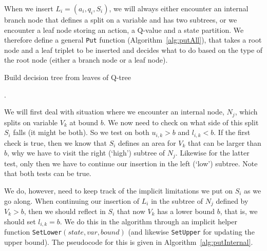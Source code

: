 \documentclass{article}
\begin{document}
When we insert $L_i = (a_i, q_i, S_i)$, we will always either encounter an
internal branch node that defines a split on a variable and has two subtrees, or
we encounter a leaf node storing an action, a Q-value and a state partition. We
therefore define a general \texttt{Put} function (Algorithm~\ref{alg:putAll}),
that takes a root node and a leaf triplet to be inserted and decides what to do based
on the type of the root node (either a branch node or a leaf node).

\begin{algorithm}[ht]
    \caption{Build decision tree from leaves of Q-tree}\label{alg:putAll}.

    \begin{algorithmic}[1]
        \Else{}%
        \EndIf%
        \EndFunction%
    \end{algorithmic}

\end{algorithm}

We will first deal with situation where we encounter an internal node, $N_j$,
which splits on variable $V_k$ at bound $b$. We now need to check on what side
of this split $S_i$ falls (it might be both). So we test on both $u_{i,k} > b$
and $l_{i,k} < b$. If the first check is true, then we know that $S_i$ defines
an area for $V_k$ that can be larger than $b$, why we have to visit the right
(`high') subtree of $N_j$. Likewise for the latter test, only then we have to
continue our insertion in the left (`low') subtree. Note that both tests
can be true.

We do, however, need to keep track of the implicit limitations we put on $S_i$
as we go along. When continuing our insertion of $L_i$ in the subtree of $N_j$
defined by $V_k > b$, then we should reflect in $S_i$ that now $V_k$ has a lower
bound $b$, that is, we should set $l_{i,k} = b$. We do this in the algorithm
through an implicit helper function \texttt{SetLower$(state, var, bound)$} (and
likewise \texttt{SetUpper} for updating the upper bound). The pseudocode for
this is given in Algorithm~\ref{alg:putInternal}.
\end{document}
